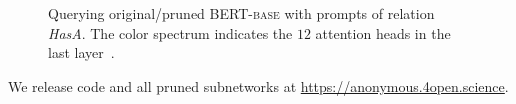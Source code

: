 \begin{figure}[t]
	\centering
	\caption{Querying original/pruned \textsc{BERT-base} with prompts of relation \textit{HasA}. The color spectrum indicates the $12$ attention heads in the last layer~\citep{DBLP:journals/corr/abs-1904-02679}.} \label{fig:LAMA}
\end{figure}



We release code and all pruned subnetworks at \url{https://anonymous.4open.science}.
